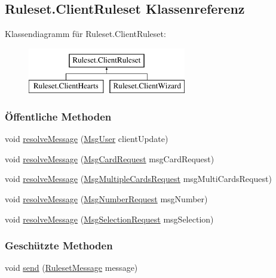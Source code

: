 \hypertarget{a00014}{\subsection{Ruleset.\-Client\-Ruleset Klassenreferenz}
\label{a00014}
}
Klassendiagramm für Ruleset.\-Client\-Ruleset\-:\begin{figure}[H]
\begin{center}
\leavevmode
\includegraphics[height=2.000000cm]{a00014}
\end{center}
\end{figure}
\subsubsection*{Öffentliche Methoden}
\begin{DoxyCompactItemize}
\item 
void \hyperlink{a00014_aa232af6bfa9c49ce4f32533fe360cfa9}{resolve\-Message} (\hyperlink{a00067}{Msg\-User} client\-Update)
\item 
void \hyperlink{a00014_a7b028c4940b05fd45598490ce0d50f7d}{resolve\-Message} (\hyperlink{a00058}{Msg\-Card\-Request} msg\-Card\-Request)
\item 
void \hyperlink{a00014_abda49f0ef6096c7722428cd8fb0db064}{resolve\-Message} (\hyperlink{a00062}{Msg\-Multiple\-Cards\-Request} msg\-Multi\-Cards\-Request)
\item 
void \hyperlink{a00014_a5a41279ef3757199b7bd4555de8753a3}{resolve\-Message} (\hyperlink{a00064}{Msg\-Number\-Request} msg\-Number)
\item 
void \hyperlink{a00014_ae15d2f9d59f3b54add9ac5bf1c286d72}{resolve\-Message} (\hyperlink{a00066}{Msg\-Selection\-Request} msg\-Selection)
\end{DoxyCompactItemize}
\subsubsection*{Geschützte Methoden}
\begin{DoxyCompactItemize}
\item 
void \hyperlink{a00014_ac24855cebaee849048e10e08f3c0f370}{send} (\hyperlink{a00075}{Ruleset\-Message} message)
\end{DoxyCompactItemize}


